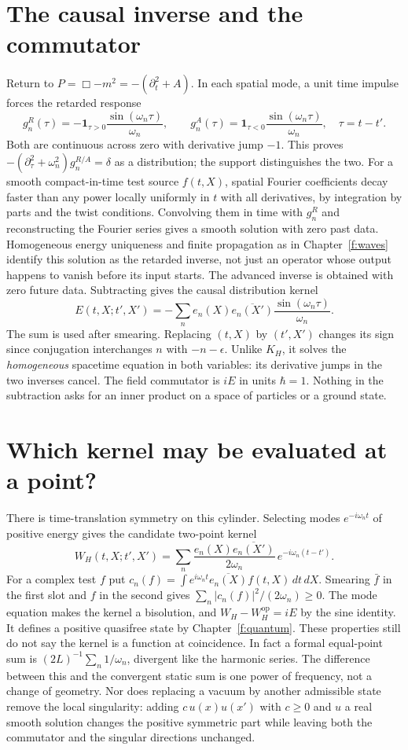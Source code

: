 \section{The causal inverse and the commutator}
Return to $P=\Box-m^2=-(\partial_t^2+A)$. In each spatial mode, a unit time impulse forces the retarded response
\[
 g^R_n(\tau)=-\mathbf1_{\tau>0}\frac{\sin(\omega_n\tau)}{\omega_n},\qquad
 g^A_n(\tau)=\mathbf1_{\tau<0}\frac{\sin(\omega_n\tau)}{\omega_n},\quad \tau=t-t'.
\]
Both are continuous across zero with derivative jump $-1$. This proves $-(\partial_\tau^2+\omega_n^2)g_n^{R/A}=\delta$ as a distribution; the support distinguishes the two. For a smooth compact-in-time test source $f(t,X)$, spatial Fourier coefficients decay faster than any power locally uniformly in $t$ with all derivatives, by integration by parts and the twist conditions. Convolving them in time with $g_n^R$ and reconstructing the Fourier series gives a smooth solution with zero past data. Homogeneous energy uniqueness and finite propagation as in Chapter~\ref{f:waves} identify this solution as the retarded inverse, not just an operator whose output happens to vanish before its input starts. The advanced inverse is obtained with zero future data. Subtracting gives the causal distribution kernel
\[
 E(t,X;t',X')=-\sum_n e_n(X)\overline{e_n(X')}\frac{\sin(\omega_n\tau)}{\omega_n} .
\]
The sum is used after smearing. Replacing $(t,X)$ by $(t',X')$ changes its sign since conjugation interchanges $n$ with $-n-\epsilon$. Unlike $K_H$, it solves the \emph{homogeneous} spacetime equation in both variables: its derivative jumps in the two inverses cancel. The field commutator is $iE$ in units $\hbar=1$. Nothing in the subtraction asks for an inner product on a space of particles or a ground state.

\section{Which kernel may be evaluated at a point?}
There is time-translation symmetry on this cylinder. Selecting modes $e^{-i\omega_n t}$ of positive energy gives the candidate two-point kernel
\begin{equation}
 W_H(t,X;t',X')=\sum_n\frac{e_n(X)\overline{e_n(X')}}{2\omega_n}\,e^{-i\omega_n(t-t')} .\label{f:circle-two-point}
\end{equation}
For a complex test $f$ put $c_n(f)=\int e^{i\omega_n t}\overline{e_n(X)} f(t,X)\,dt\,dX$. Smearing $\bar f$ in the first slot and $f$ in the second gives $\sum_n |c_n(f)|^2/(2\omega_n)\ge0$. The mode equation makes the kernel a bisolution, and $W_H-W_H^{\mathrm{op}}=iE$ by the sine identity. It defines a positive quasifree state by Chapter~\ref{f:quantum}. These properties still do not say the kernel is a function at coincidence. In fact a formal equal-point sum is $(2L)^{-1}\sum_n1/\omega_n$, divergent like the harmonic series. The difference between this and the convergent static sum is one power of frequency, not a change of geometry. Nor does replacing a vacuum by another admissible state remove the local singularity: adding $c\,u(x)u(x')$ with $c\ge0$ and $u$ a real smooth solution changes the positive symmetric part while leaving both the commutator and the singular directions unchanged.

